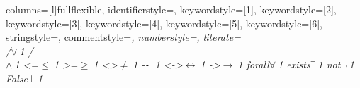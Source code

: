 {%
columns=[l]fullflexible,
identifierstyle={\color{black}},
keywordstyle=[1]{\color{violet}},
keywordstyle=[2]{\color{forestgreen}},
keywordstyle=[3]{\color{forestgreen}},
keywordstyle=[4]{\color{blue}},
keywordstyle=[5]{\color{red}},
keywordstyle=[6]{\color{violet}},
stringstyle=,
commentstyle=\it\ttfamily\color{brown},
numberstyle=\tiny,
literate={\\/}{{$\lor~$}}1
         {/\\}{{$\land~$}}1
         {<=}{{$\le~$}}1
         {>=}{{$\ge~$}}1
         {<>}{{$\neq~$}}1
         {-}{{\texttt{- }}}1         
         {<->}{{$\leftrightarrow~$}}1
         {->}{{$\to~$}}1
         {forall}{{$\forall~$}}1
         {exists}{{$\exists~$}}1
         {not}{{$\neg~$}}1
         {False}{{$\bot~$}}1
}

\lstset{language=Coq}
